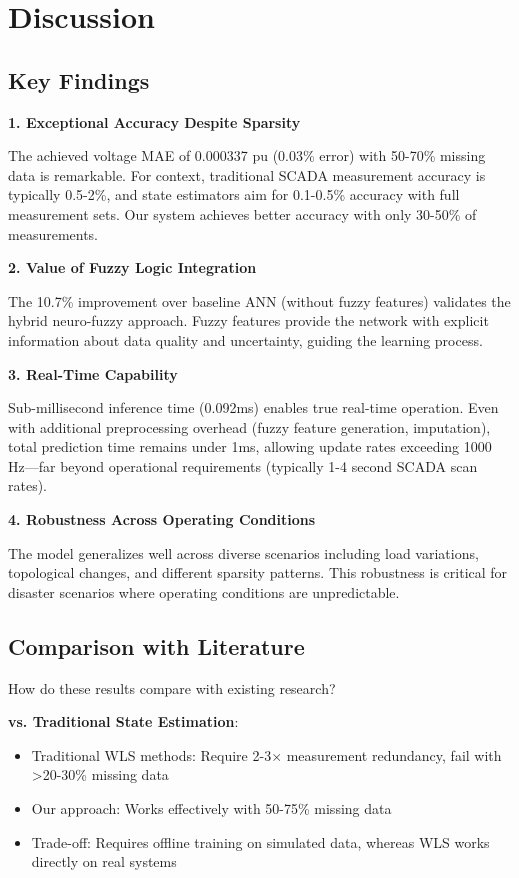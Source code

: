 \documentclass[12pt,a4paper]{report}
\begin{document}
\section{Discussion}

\subsection{Key Findings}

\textbf{1. Exceptional Accuracy Despite Sparsity}

The achieved voltage MAE of 0.000337 pu (0.03\% error) with 50-70\% missing data is remarkable. For context, traditional SCADA measurement accuracy is typically 0.5-2\%, and state estimators aim for 0.1-0.5\% accuracy with full measurement sets. Our system achieves better accuracy with only 30-50\% of measurements.

\textbf{2. Value of Fuzzy Logic Integration}

The 10.7\% improvement over baseline ANN (without fuzzy features) validates the hybrid neuro-fuzzy approach. Fuzzy features provide the network with explicit information about data quality and uncertainty, guiding the learning process.

\textbf{3. Real-Time Capability}

Sub-millisecond inference time (0.092ms) enables true real-time operation. Even with additional preprocessing overhead (fuzzy feature generation, imputation), total prediction time remains under 1ms, allowing update rates exceeding 1000 Hz—far beyond operational requirements (typically 1-4 second SCADA scan rates).

\textbf{4. Robustness Across Operating Conditions}

The model generalizes well across diverse scenarios including load variations, topological changes, and different sparsity patterns. This robustness is critical for disaster scenarios where operating conditions are unpredictable.

\subsection{Comparison with Literature}

How do these results compare with existing research?

\textbf{vs. Traditional State Estimation}:
\begin{itemize}
    \item Traditional WLS methods: Require 2-3$\times$ measurement redundancy, fail with >20-30\% missing data
    \item Our approach: Works effectively with 50-75\% missing data
    \item Trade-off: Requires offline training on simulated data, whereas WLS works directly on real systems
\end{itemize}
\end{document}
